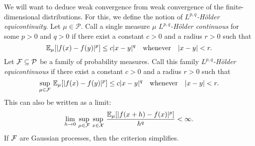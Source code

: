 \documentclass[12pt]{report}
\begin{document}
We will want to deduce weak convergence from weak convergence of the finite-dimensional distributions.
For this, we define the notion of \emph{$L^{p,q}$-H\"older equicontinuity}.
Let $\mu \in \mathcal{P}$.
Call a single measure $\mu$ \emph{$L^{p,q}$-H\"older continuous} for some $p > 0$ and $q > 0$ if there exist a constant $c > 0$ and a radius $r > 0$ such that
\begin{equation}
    \mathbb{E}_\mu[\lvert f(x) - f(y)\rvert^p] \le c \lvert x - y\rvert^q
    \quad\text{whenever}\quad
    \lvert x - y\rvert < r.
\end{equation}
Let $\mathcal{F} \subseteq \mathcal{P}$ be a family of probability measures.
Call this family \emph{$L^{p,q}$-H\"older equicontinuous} if there exist a constant $c > 0$ and a radius $r > 0$ such that
\begin{equation}
    \operatorname*{sup}_{\mu \in \mathcal{F}}\,
    \mathbb{E}_\mu[\lvert f(x) - f(y)\rvert^p] \le c \lvert x - y\rvert^q
    \quad\text{whenever}\quad
    \lvert x - y\rvert < r.
\end{equation}
This can also be written as a limit:
\begin{equation}
    \lim_{h \to 0}\,
    \operatorname*{sup}_{\mu \in \mathcal{F}}\,
    \operatorname*{sup}_{x \in \mathcal{X}}\,
    \frac{\mathbb{E}_\mu[\lvert f(x + h) - f(x)\rvert^p]}{h^q}
    < \infty.
\end{equation}
If $\mathcal{F}$ are Gaussian processes, then the criterion simplifies.
\end{document}
